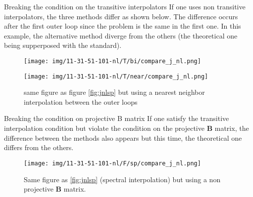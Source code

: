 \documentclass[8pt]{beamer}
\begin{document}
\begin{frame}{Breaking the condition on the transitive interpolators}
If one uses non transitive interpolators, the three methods differ as shown below. The difference occurs after the first outer loop since the problem is the same in the first one. In this example, the alternative method diverge from the others (the theoretical one being supperposed with the standard).
\begin{center}
\begin{figure}
  \begin{minipage}[c]{0.48\textwidth}
    \texttt{[image: img/11-31-51-101-nl/T/bi/compare\_j\_nl.png]}
    \caption{same figure as figure \ref{fig:jnlsp} but using a bilinear interpolation between the outer loops}
  \end{minipage}\hfill
  \begin{minipage}[c]{0.48\textwidth}
  \texttt{[image: img/11-31-51-101-nl/T/near/compare\_j\_nl.png]}
    \caption{same figure as figure \ref{fig:jnlsp} but using a nearest neighbor interpolation between the outer loops}
  \end{minipage}
\end{figure}
\end{center}
\end{frame}


\begin{frame}{Breaking the condition on projective B matrix}
If one satisfy the transitive interpolation condition but violate the condition on the projective $\mathbf{B}$ matrix, the difference between the methods also appears but this time, the theoretical one differs from the others.
\vspace{-0.2cm}
\begin{center}
\begin{figure}
  \begin{minipage}[c]{0.67\textwidth}
    \texttt{[image: img/11-31-51-101-nl/F/sp/compare\_j\_nl.png]}
  \end{minipage}\hfill
  \begin{minipage}[c]{0.23\textwidth}
    \caption{Same figure as \ref{fig:jnlsp} (spectral interpolation) but using a non projective $\mathbf{B}$ matrix.}
    \label{fig:jnlspF}
  \end{minipage}
\end{figure}
\end{center}
\end{frame}
\end{document}
